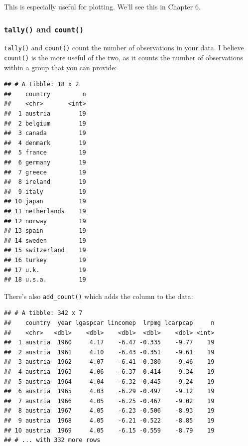 \documentclass[]{gitbook}
\newenvironment{Shaded}{\begin{snugshade}}{\end{snugshade}}
\newcommand{\KeywordTok}[1]{\textcolor[rgb]{0.13,0.29,0.53}{\textbf{#1}}}
\newcommand{\NormalTok}[1]{#1}
\newcommand{\OperatorTok}[1]{\textcolor[rgb]{0.81,0.36,0.00}{\textbf{#1}}}
\newcommand{\StringTok}[1]{\textcolor[rgb]{0.31,0.60,0.02}{#1}}
\begin{document}
This is especially useful for plotting. We'll see this in Chapter 6.

\hypertarget{tally-and-count}{%
\subsubsection{\texorpdfstring{\texttt{tally()} and \texttt{count()}}{tally() and count()}}\label{tally-and-count}}

\texttt{tally()} and \texttt{count()} count the number of observations in your data. I believe \texttt{count()} is the
more useful of the two, as it counts the number of observations within a group that you can provide:

\begin{Shaded}
\end{Shaded}

\begin{verbatim}
## # A tibble: 18 x 2
##    country         n
##    <chr>       <int>
##  1 austria        19
##  2 belgium        19
##  3 canada         19
##  4 denmark        19
##  5 france         19
##  6 germany        19
##  7 greece         19
##  8 ireland        19
##  9 italy          19
## 10 japan          19
## 11 netherlands    19
## 12 norway         19
## 13 spain          19
## 14 sweden         19
## 15 switzerland    19
## 16 turkey         19
## 17 u.k.           19
## 18 u.s.a.         19
\end{verbatim}

There's also \texttt{add\_count()} which adds the column to the data:

\begin{Shaded}
\end{Shaded}

\begin{verbatim}
## # A tibble: 342 x 7
##    country  year lgaspcar lincomep  lrpmg lcarpcap     n
##    <chr>   <dbl>    <dbl>    <dbl>  <dbl>    <dbl> <int>
##  1 austria  1960     4.17    -6.47 -0.335    -9.77    19
##  2 austria  1961     4.10    -6.43 -0.351    -9.61    19
##  3 austria  1962     4.07    -6.41 -0.380    -9.46    19
##  4 austria  1963     4.06    -6.37 -0.414    -9.34    19
##  5 austria  1964     4.04    -6.32 -0.445    -9.24    19
##  6 austria  1965     4.03    -6.29 -0.497    -9.12    19
##  7 austria  1966     4.05    -6.25 -0.467    -9.02    19
##  8 austria  1967     4.05    -6.23 -0.506    -8.93    19
##  9 austria  1968     4.05    -6.21 -0.522    -8.85    19
## 10 austria  1969     4.05    -6.15 -0.559    -8.79    19
## # ... with 332 more rows
\end{verbatim}
\end{document}
